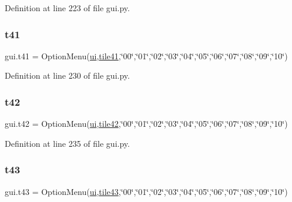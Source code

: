 Definition at line 223 of file gui.\+py.

\mbox{\label{namespacegui_a20ba5872d7ff4f5062a4ba3576a9b7b5}} 
\subsubsection{\texorpdfstring{t41}{t41}}
{\footnotesize\ttfamily gui.\+t41 = Option\+Menu(\mbox{\hyperlink{namespacegui_a40ab7281456eadbea2dc2038f5c24fa1}{ui}},\mbox{\hyperlink{namespacegui_a70488256d9402586c324ab9d2aa29c16}{tile41}},\char`\"{}00\char`\"{},\char`\"{}01\char`\"{},\char`\"{}02\char`\"{},\char`\"{}03\char`\"{},\char`\"{}04\char`\"{},\char`\"{}05\char`\"{},\char`\"{}06\char`\"{},\char`\"{}07\char`\"{},\char`\"{}08\char`\"{},\char`\"{}09\char`\"{},\char`\"{}10\char`\"{})}



Definition at line 230 of file gui.\+py.

\mbox{\label{namespacegui_af44e4929fe16fa32eb2c9faded7249a2}} 
\subsubsection{\texorpdfstring{t42}{t42}}
{\footnotesize\ttfamily gui.\+t42 = Option\+Menu(\mbox{\hyperlink{namespacegui_a40ab7281456eadbea2dc2038f5c24fa1}{ui}},\mbox{\hyperlink{namespacegui_acaf018b80c58203097d99ae83972c532}{tile42}},\char`\"{}00\char`\"{},\char`\"{}01\char`\"{},\char`\"{}02\char`\"{},\char`\"{}03\char`\"{},\char`\"{}04\char`\"{},\char`\"{}05\char`\"{},\char`\"{}06\char`\"{},\char`\"{}07\char`\"{},\char`\"{}08\char`\"{},\char`\"{}09\char`\"{},\char`\"{}10\char`\"{})}



Definition at line 235 of file gui.\+py.

\mbox{\label{namespacegui_aaed30a2dbf1830a35fe7856139490b45}} 
\subsubsection{\texorpdfstring{t43}{t43}}
{\footnotesize\ttfamily gui.\+t43 = Option\+Menu(\mbox{\hyperlink{namespacegui_a40ab7281456eadbea2dc2038f5c24fa1}{ui}},\mbox{\hyperlink{namespacegui_a4b23364a860cd384c4f910c6144a213e}{tile43}},\char`\"{}00\char`\"{},\char`\"{}01\char`\"{},\char`\"{}02\char`\"{},\char`\"{}03\char`\"{},\char`\"{}04\char`\"{},\char`\"{}05\char`\"{},\char`\"{}06\char`\"{},\char`\"{}07\char`\"{},\char`\"{}08\char`\"{},\char`\"{}09\char`\"{},\char`\"{}10\char`\"{})}



